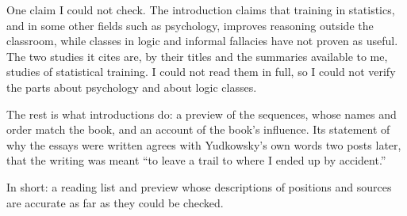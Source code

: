\begin{afterword}
One claim I could not check. The introduction claims that training in statistics, and in some other fields such as psychology, improves reasoning outside the classroom, while classes in logic and informal fallacies have not proven as useful. The two studies it cites are, by their titles and the summaries available to me, studies of statistical training. I could not read them in full, so I could not verify the parts about psychology and about logic classes.

The rest is what introductions do: a preview of the sequences, whose names and order match the book, and an account of the book's influence. Its statement of why the essays were written agrees with Yudkowsky's own words two posts later, that the writing was meant ``to leave a trail to where I ended up by accident.''

In short: a reading list and preview whose descriptions of positions and sources are accurate as far as they could be checked.
\end{afterword}
